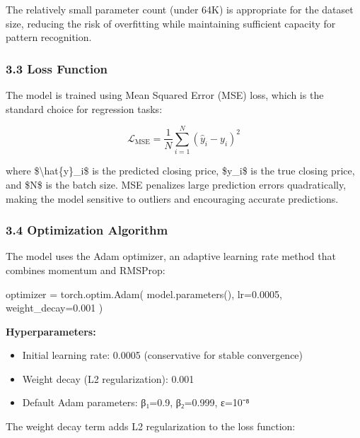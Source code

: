 \documentclass[
]{article}
\newenvironment{Shaded}{}{}
\newcommand{\FloatTok}[1]{\textcolor[rgb]{0.25,0.63,0.44}{#1}}
\newcommand{\NormalTok}[1]{#1}
\newcommand{\OperatorTok}[1]{\textcolor[rgb]{0.40,0.40,0.40}{#1}}
\begin{document}
The relatively small parameter count (under 64K) is appropriate for the
dataset size, reducing the risk of overfitting while maintaining
sufficient capacity for pattern recognition.

\subsubsection{3.3 Loss Function}\label{33-loss-function}

The model is trained using Mean Squared Error (MSE) loss, which is the
standard choice for regression tasks:

\[\mathcal{L}_{\text{MSE}} = \frac{1}{N} \sum_{i=1}^{N} (\hat{y}_i - y_i)^2\]

where \$\textbackslash hat\{y\}\_i\$ is the predicted closing price,
\$y\_i\$ is the true closing price, and \$N\$ is the batch size. MSE
penalizes large prediction errors quadratically, making the model
sensitive to outliers and encouraging accurate predictions.

\subsubsection{3.4 Optimization
Algorithm}\label{34-optimization-algorithm}

The model uses the Adam optimizer, an adaptive learning rate method that
combines momentum and RMSProp:

\begin{Shaded}
\begin{Highlighting}[]
\NormalTok{optimizer }\OperatorTok{=}\NormalTok{ torch.optim.Adam(}
\NormalTok{    model.parameters(),}
\NormalTok{    lr}\OperatorTok{=}\FloatTok{0.0005}\NormalTok{,}
\NormalTok{    weight\_decay}\OperatorTok{=}\FloatTok{0.001}
\NormalTok{)}
\end{Highlighting}
\end{Shaded}

\textbf{Hyperparameters:}

\begin{itemize}
\item
  Initial learning rate: 0.0005 (conservative for stable convergence)
\item
  Weight decay (L2 regularization): 0.001
\item
  Default Adam parameters: β₁=0.9, β₂=0.999, ε=10⁻⁸
\end{itemize}

The weight decay term adds L2 regularization to the loss function:
\end{document}
